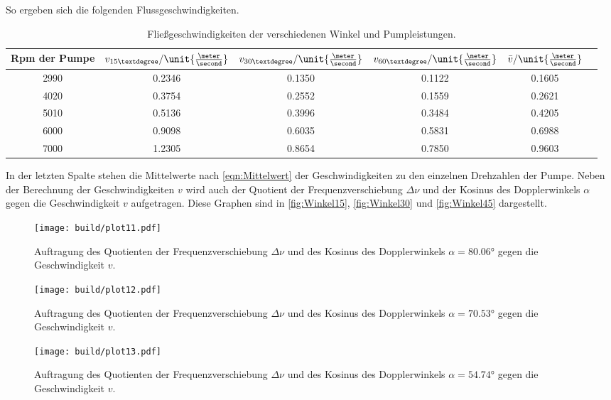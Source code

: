 So ergeben sich die folgenden Flussgeschwindigkeiten.
\begin{table}
     \centering
     \caption{Fließgeschwindigkeiten der verschiedenen Winkel und Pumpleistungen.}
     \begin{tabular}{c c c c c c}
          \toprule
          Rpm der Pumpe & $v_{15°}\mathrm{/} \unit{\frac{\meter}{\second}}$ & $v_{30°}\mathrm{/} \unit{\frac{\meter}{\second}}$& $v_{60°}\mathrm{/} \unit{\frac{\meter}{\second}}$ & $\bar{v}\mathrm{/} \unit{\frac{\meter}{\second}}$\\
          \midrule
          2990 & 0.2346 & 0.1350 & 0.1122 & 0.1605\\
          4020 & 0.3754 & 0.2552 & 0.1559 & 0.2621\\
          5010 & 0.5136 & 0.3996 & 0.3484 & 0.4205\\
          6000 & 0.9098 & 0.6035 & 0.5831 & 0.6988\\
          7000 & 1.2305 & 0.8654 & 0.7850 & 0.9603\\ 
          \bottomrule
     \end{tabular}
\end{table}
In der letzten Spalte stehen die Mittelwerte nach \autoref{eqn:Mittelwert} der Geschwindigkeiten zu den einzelnen Drehzahlen der Pumpe. 
Neben der Berechnung der Geschwindigkeiten $v$ wird auch der Quotient der Frequenzverschiebung $\Delta \nu$ und der Kosinus des Dopplerwinkels $\alpha$ gegen die Geschwindigkeit $v$ aufgetragen.
Diese Graphen sind in \autoref{fig:Winkel15}, \autoref{fig:Winkel30} und \autoref{fig:Winkel45} dargestellt.
\begin{figure}
     \centering
     \texttt{[image: build/plot11.pdf]}
     \caption{Auftragung des Quotienten der Frequenzverschiebung $\Delta \nu$ und des Kosinus des Dopplerwinkels $\alpha=80.06°$ gegen die Geschwindigkeit $v$.}
     \label{fig:Winkel15}
\end{figure}

\begin{figure}
     \centering
     \texttt{[image: build/plot12.pdf]}
     \caption{Auftragung des Quotienten der Frequenzverschiebung $\Delta \nu$ und des Kosinus des Dopplerwinkels $\alpha=70.53°$ gegen die Geschwindigkeit $v$.}
     \label{fig:Winkel30}
\end{figure}

\begin{figure}
     \centering
     \texttt{[image: build/plot13.pdf]}
     \caption{Auftragung des Quotienten der Frequenzverschiebung $\Delta \nu$ und des Kosinus des Dopplerwinkels $\alpha=54.74°$ gegen die Geschwindigkeit $v$.}
     \label{fig:Winkel45}
\end{figure}


